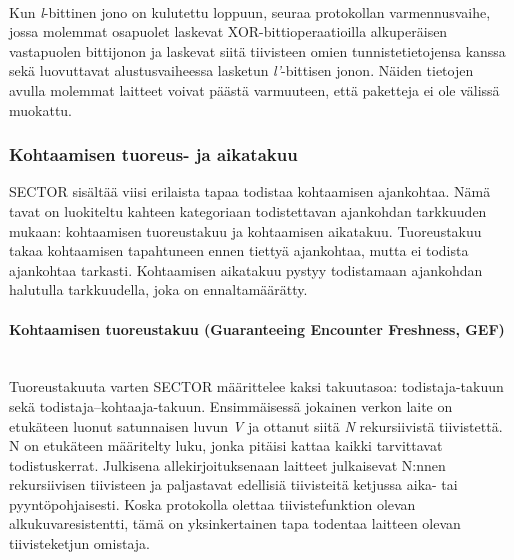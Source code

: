 \documentclass[finnish]{tktltiki2}
\theoremstyle{definition}
\theoremstyle{remark}
\begin{document}
\noindent\\
Kun \emph{l}-bittinen jono on kulutettu loppuun, seuraa protokollan varmennusvaihe, jossa molemmat osapuolet laskevat XOR-bittioperaatioilla alkuperäisen vastapuolen bittijonon ja laskevat siitä tiivisteen omien tunnistetietojensa kanssa sekä luovuttavat alustusvaiheessa lasketun \emph{l'}-bittisen jonon. Näiden tietojen avulla molemmat laitteet voivat päästä varmuuteen, että paketteja ei ole välissä muokattu.

\subsubsection{Kohtaamisen tuoreus- ja aikatakuu}

SECTOR sisältää viisi erilaista tapaa todistaa kohtaamisen ajankohtaa. Nämä tavat on luokiteltu kahteen kategoriaan todistettavan ajankohdan tarkkuuden mukaan: kohtaamisen tuoreustakuu ja kohtaamisen aikatakuu. Tuoreustakuu takaa kohtaamisen tapahtuneen ennen tiettyä ajankohtaa, mutta ei todista ajankohtaa tarkasti. Kohtaamisen aikatakuu pystyy todistamaan ajankohdan halutulla tarkkuudella, joka on ennaltamäärätty. 

\paragraph{Kohtaamisen tuoreustakuu (Guaranteeing Encounter Freshness, GEF)}
\noindent\\
Tuoreustakuuta varten SECTOR määrittelee kaksi takuutasoa: todistaja-takuun sekä todistaja--kohtaaja-takuun. Ensimmäisessä jokainen verkon laite on etukäteen luonut satunnaisen luvun \emph{V} ja ottanut siitä \emph{N} rekursiivistä tiivistettä. N on etukäteen määritelty luku, jonka pitäisi kattaa kaikki tarvittavat todistuskerrat. Julkisena allekirjoituksenaan laitteet julkaisevat N:nnen rekursiivisen tiivisteen ja paljastavat edellisiä tiivisteitä ketjussa aika- tai pyyntöpohjaisesti. Koska protokolla olettaa tiivistefunktion olevan alkukuvaresistentti, tämä on yksinkertainen tapa todentaa laitteen olevan tiivisteketjun omistaja.
\end{document}
